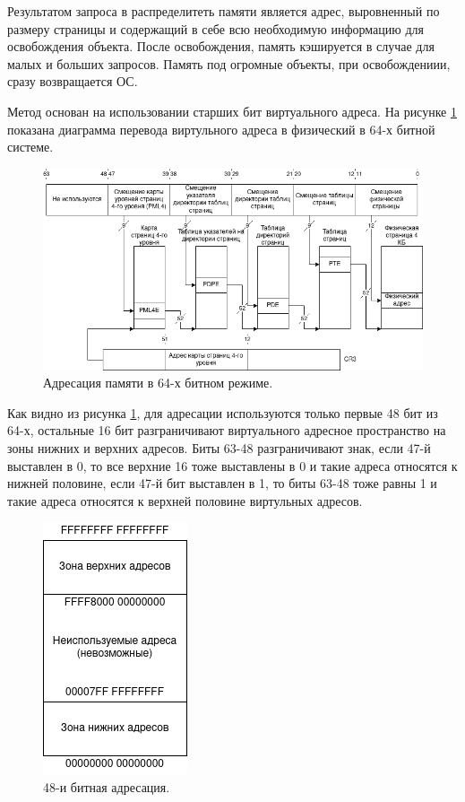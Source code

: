 Результатом запроса в распределитеть памяти является адрес, выровненный по размеру страницы и содержащий в себе всю необходимую информацию для освобождения объекта. После освобождения, память кэшируется в случае для малых и больших запросов. Память под огромные объекты, при освобождениии, сразу возвращается ОС.

Метод основан на использовании старших бит виртуального адреса. На рисунке \ref{64bit-memory-addressing} показана диаграмма перевода виртульного адреса в физический в 64-х битной системе.

\begin{figure}[!h]
	\begin{center}
		\includegraphics[scale=0.6]{images/64bit-memory-addressing.png}
		\caption{Адресация памяти в 64-х битном режиме.}
		\label{64bit-memory-addressing}
	\end{center}
\end{figure}

Как видно из рисунка \ref{64bit-memory-addressing}, для адресации используются только первые 48 бит из 64-х, остальные 16 бит разграничивают виртуального адресное пространство на зоны нижних и верхних адресов. Биты 63-48 разграничивают знак, если 47-й выставлен в 0, то все верхние 16 тоже выставлены в 0 и такие адреса относятся к нижней половине, если 47-й бит выставлен в 1, то биты 63-48 тоже равны 1 и такие адреса относятся к верхней половине виртульных адресов.\cite{paging}

\begin{figure}[!h]
	\begin{center}
		\includegraphics[scale=0.6]{images/48bit-half-spaces.png}
		\caption{48-и битная адресация.}
		\label{48bit-half-spaces}
	\end{center}
\end{figure}

